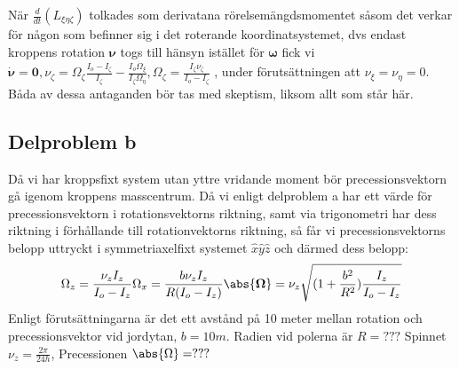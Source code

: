 \documentclass[12pt,a4paper]{article}
\begin{document}
När $\frac{d}{dt}(L_{\xi\eta\zeta})$ tolkades som derivatana rörelsemängdsmomentet såsom det verkar för någon som befinner sig i det roterande koordinatsystemet, dvs endast kroppens rotation $\boldsymbol{\nu}$ togs till hänsyn istället för $\boldsymbol{\omega}$ fick vi $\dot{\boldsymbol{\nu}} = \mathbf{0} , \nu_{\zeta} = \Omega_{\zeta}\frac{I_o-I_{\zeta}}{I_{\zeta}} - \frac{I_o \dot{\Omega}_{\xi}}{I_{\zeta} \Omega_{\eta}} , \Omega_{\zeta} = \frac{I_{\zeta} \nu_{\zeta}}{I_o-I_{\zeta}}$ , under förutsättningen att $\nu_{\xi}=\nu_{\eta}=0$. Båda av dessa antaganden bör tas med skeptism, liksom allt som står här.

\subsection{Delproblem b}
Då vi har kroppsfixt system utan yttre vridande moment bör precessionsvektorn gå igenom kroppens masscentrum.  Då vi enligt delproblem a har ett värde för precessionsvektorn i rotationsvektorns riktning, samt via trigonometri har dess riktning i förhållande till rotationvektorns riktning, så får vi precessionsvektorns belopp uttryckt i symmetriaxelfixt systemet $\hat{x}\hat{y}\hat{z}$ och därmed dess belopp:
\begin{equation*}
\Omega_z = \frac{\nu_z I_z}{I_o-I_z}
\Omega_x = \frac{b \nu_z I_z}{R(I_o-I_z)}
\abs{\boldsymbol{\Omega}}=\nu_z \sqrt{(1+\frac{b^2}{R^2})\frac{I_z}{I_o-I_z}} 
\end{equation*}
Enligt förutsättningarna är det ett avstånd på 10 meter mellan rotation och precessionsvektor vid jordytan, $b=10m$. Radien vid polerna är $R= ???$
Spinnet $\nu_z = \frac{2\pi}{24h}$, Precessionen $\abs{\Omega} = ???$
\end{document}
